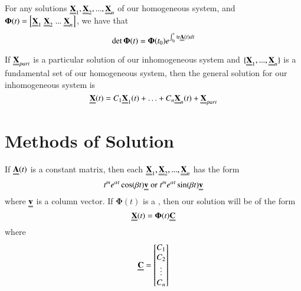 
\begin{theorem}
        For any solutions $\Emph{X}_1,\Emph{X}_2,...,\Emph{X}_n$ of our homogeneous system, and $\boldsymbol{\Phi}(t) = \left[\Emph{X}_1\;\Emph{X}_2\;...\;\Emph{X}_n\right]$, we have that \begin{equation}
                \det\boldsymbol{\Phi}(t) = \boldsymbol{\Phi}(t_0)e^{\int_{t_0}^t\text{tr}\Emph{A}(t)dt}
        \end{equation}
\end{theorem}





\begin{theorem}
        If $\Emph{X}_{part}$ is a particular solution of our inhomogeneous system and $\{\Emph{X}_1,...,\Emph{X}_n\}$ is a fundamental set of our homogeneous system, then the general solution for our inhomogeneous system is \begin{equation}
                \Emph{X}(t) = C_1\Emph{X}_1(t) + \hdots +  C_n\Emph{X}_n(t) + \Emph{X}_{part}
        \end{equation}
\end{theorem}


\section{Methods of Solution}


\begin{definition}
        If $\Emph{A}(t)$ is a constant matrix, then each $\Emph{X}_1,\Emph{X}_2,...,\Emph{X}_n$ has the form \begin{equation}
                t^me^{\alpha t}\cos(\beta t)\Emph{v}\;\text{or}\;t^me^{\alpha t}\sin(\beta t)\Emph{v}
        \end{equation}
        where $\Emph{v}$ is a column vector. If $\boldsymbol{\Phi}(t)$ is a , then our solution will be of the form \begin{equation}
                \Emph{X}(t) = \boldsymbol{\Phi}(t)\Emph{C}
        \end{equation}
        where \begin{equation}
                \Emph{C} = \begin{bmatrix} C_1 \\ C_2 \\ \vdots \\ C_n \end{bmatrix}
        \end{equation}
\end{definition}


